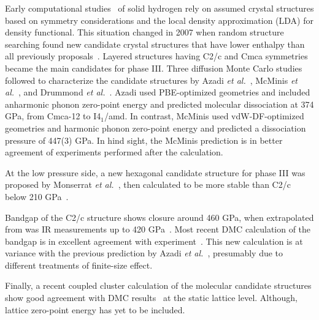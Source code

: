 Early computational studies~\cite{Kaxiras1991,Nagara1992,Mazin1995,Kohanoff1997,Johnson2000} of solid hydrogen rely on assumed crystal structures based on symmetry considerations and the local density approximation (LDA) for density functional. This situation changed in 2007 when random structure searching found new candidate crystal structures that have lower enthalpy than all previously proposals~\cite{Pickard2007}. Layered structures having C2/c and Cmca symmetries became the main candidates for phase III.
Three diffusion Monte Carlo studies followed to characterize the candidate structures by Azadi \textit{et al.}~\cite{Azadi2014}, McMinis \textit{et al.}~\cite{McMinis2015}, and Drummond \textit{et al.}~\cite{Drummond2015}.
Azadi used PBE-optimized geometries and included anharmonic phonon zero-point energy and predicted molecular dissociation at 374 GPa, from Cmca-12 to I4$_1$/amd. In contrast, McMinis used vdW-DF-optimized geometries and harmonic phonon zero-point energy and predicted a dissociation pressure of 447(3) GPa.
In hind sight, the McMinis prediction is in better agreement of experiments performed after the calculation.

At the low pressure side, a new hexagonal candidate structure for phase III was proposed by Monserrat \textit{et al.}~\cite{Monserrat2016}, then calculated to be more stable than C2/c below 210 GPa~\cite{Azadi2019}.

Bandgap of the C2/c structure shows closure around 460 GPa, when extrapolated from  was IR measurements up to 420 GPa~\cite{Loubeyre2020}. Most recent DMC calculation of the bandgap is in excellent agreement with experiment~\cite{Gorelov2019}. This new calculation is at variance with the previous prediction by Azadi \textit{et al.}~\cite{Azadi2019}, presumably due to different treatments of finite-size effect.

Finally, a recent coupled cluster calculation of the molecular candidate structures show good agreement with DMC results~\cite{Liao2019} at the static lattice level. Although, lattice zero-point energy has yet to be included.


